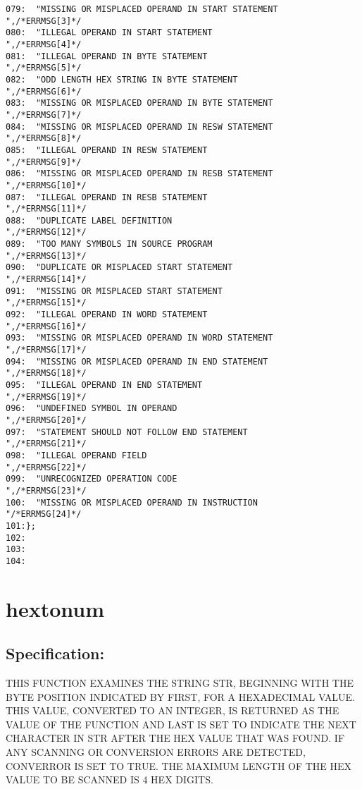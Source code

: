 \begin{verbatim}
079:  "MISSING OR MISPLACED OPERAND IN START STATEMENT   ",/*ERRMSG[3]*/
080:  "ILLEGAL OPERAND IN START STATEMENT                ",/*ERRMSG[4]*/
081:  "ILLEGAL OPERAND IN BYTE STATEMENT                 ",/*ERRMSG[5]*/
082:  "ODD LENGTH HEX STRING IN BYTE STATEMENT           ",/*ERRMSG[6]*/
083:  "MISSING OR MISPLACED OPERAND IN BYTE STATEMENT    ",/*ERRMSG[7]*/
084:  "MISSING OR MISPLACED OPERAND IN RESW STATEMENT    ",/*ERRMSG[8]*/
085:  "ILLEGAL OPERAND IN RESW STATEMENT                 ",/*ERRMSG[9]*/
086:  "MISSING OR MISPLACED OPERAND IN RESB STATEMENT    ",/*ERRMSG[10]*/
087:  "ILLEGAL OPERAND IN RESB STATEMENT                 ",/*ERRMSG[11]*/
088:  "DUPLICATE LABEL DEFINITION                        ",/*ERRMSG[12]*/
089:  "TOO MANY SYMBOLS IN SOURCE PROGRAM                ",/*ERRMSG[13]*/
090:  "DUPLICATE OR MISPLACED START STATEMENT            ",/*ERRMSG[14]*/
091:  "MISSING OR MISPLACED START STATEMENT              ",/*ERRMSG[15]*/
092:  "ILLEGAL OPERAND IN WORD STATEMENT                 ",/*ERRMSG[16]*/
093:  "MISSING OR MISPLACED OPERAND IN WORD STATEMENT    ",/*ERRMSG[17]*/
094:  "MISSING OR MISPLACED OPERAND IN END STATEMENT     ",/*ERRMSG[18]*/
095:  "ILLEGAL OPERAND IN END STATEMENT                  ",/*ERRMSG[19]*/
096:  "UNDEFINED SYMBOL IN OPERAND                       ",/*ERRMSG[20]*/
097:  "STATEMENT SHOULD NOT FOLLOW END STATEMENT         ",/*ERRMSG[21]*/
098:  "ILLEGAL OPERAND FIELD                             ",/*ERRMSG[22]*/
099:  "UNRECOGNIZED OPERATION CODE                       ",/*ERRMSG[23]*/
100:  "MISSING OR MISPLACED OPERAND IN INSTRUCTION       "/*ERRMSG[24]*/
101:};
102:
103:
104:
\end{verbatim}
\section{hextonum}
\subsection*{Specification:}
THIS FUNCTION EXAMINES THE STRING STR, BEGINNING WITH THE BYTE POSITION
INDICATED BY FIRST, FOR A HEXADECIMAL VALUE. THIS VALUE, CONVERTED TO AN
INTEGER, IS RETURNED AS THE VALUE OF THE FUNCTION AND LAST IS SET TO INDICATE
THE NEXT CHARACTER IN STR AFTER THE HEX VALUE THAT WAS FOUND. IF ANY SCANNING
OR CONVERSION ERRORS ARE DETECTED, CONVERROR IS SET TO TRUE. THE MAXIMUM
LENGTH OF THE HEX VALUE TO BE SCANNED IS 4 HEX DIGITS.

